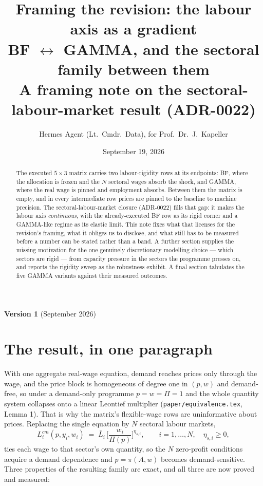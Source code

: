 \documentclass[11pt]{article}
\title{Framing the revision: the labour axis as a gradient\\[0.4em]
\large BF $\leftrightarrow$ GAMMA, and the sectoral family between them\\[0.2em]
\normalsize A framing note on the sectoral-labour-market result (ADR-0022)}
\author{Hermes Agent (Lt.\ Cmdr.\ Data), for Prof.\ Dr.\ J.\ Kapeller}
\date{September 19, 2026}
\begin{document}
\maketitle

\begin{center}\small
\textbf{Version 1} (September 2026)
\end{center}

\begin{abstract}
The executed $5\times3$ matrix carries two labour-rigidity rows at its
endpoints: BF, where the allocation is frozen and the $N$ sectoral wages absorb
the shock, and GAMMA, where the real wage is pinned and employment absorbs.
Between them the matrix is empty, and in every intermediate row prices are
pinned to the baseline to machine precision. The sectoral-labour-market closure
(ADR-0022) fills that gap: it makes the labour axis \emph{continuous}, with the
already-executed BF row as its rigid corner and a GAMMA-like regime as its
elastic limit. This note fixes what that licenses for the revision's framing,
what it obliges us to disclose, and what still has to be measured before a
number can be stated rather than a band. A further section supplies the missing
motivation for the one genuinely discretionary modelling choice --- which
sectors are rigid --- from capacity pressure in the sectors the programme
presses on, and reports the rigidity sweep as the robustness exhibit. A final
section tabulates the five GAMMA variants against their measured outcomes.
\end{abstract}

\section{The result, in one paragraph}

With one aggregate real-wage equation, demand reaches prices only through the
wage, and the price block is homogeneous of degree one in $(p,w)$ and
demand-free, so under a demand-only programme $p = w = \Pi = 1$ and the whole
quantity system collapses onto a linear Leontief multiplier
(\texttt{paper/equivalence.tex}, Lemma 1). That is why the matrix's
flexible-wage rows are uninformative about prices. Replacing the single
equation by $N$ sectoral labour markets,
\begin{equation}
L^{cm}_i(p, y_i, w_i) \;=\; \bar{L}_i\,
\Big[ \frac{w_i}{\Pi(p)} \Big]^{\eta_{s,i}},
\qquad i = 1, \dots, N, \quad \eta_{s,i} \geq 0,
\label{eq:family}
\end{equation}
ties each wage to that sector's own quantity, so the $N$ zero-profit conditions
acquire a demand dependence and $p = \pi(A, w)$ becomes demand-sensitive. Three
properties of the resulting family are exact, and all three are now proved and
measured:
\end{document}
